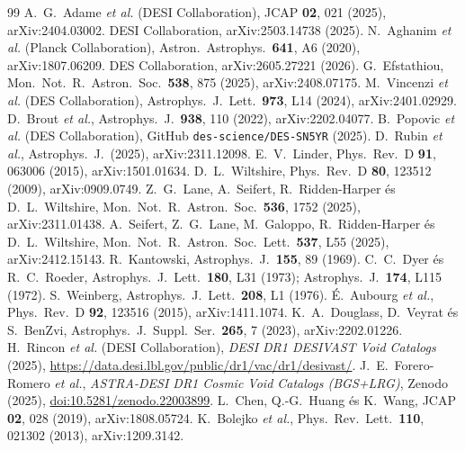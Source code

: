 \documentclass[11pt,a4paper]{article}
\begin{document}
\begin{thebibliography}{99}
 A.~G.~Adame \textit{et al.} (DESI Collaboration), JCAP \textbf{02}, 021 (2025), arXiv:2404.03002.
 DESI Collaboration, arXiv:2503.14738 (2025).
 N.~Aghanim \textit{et al.} (Planck Collaboration), Astron.\ Astrophys.\ \textbf{641}, A6 (2020), arXiv:1807.06209.
 DES Collaboration, arXiv:2605.27221 (2026).
 G.~Efstathiou, Mon.\ Not.\ R.\ Astron.\ Soc.\ \textbf{538}, 875 (2025), arXiv:2408.07175.
 M.~Vincenzi \textit{et al.} (DES Collaboration), Astrophys.\ J.\ Lett.\ \textbf{973}, L14 (2024), arXiv:2401.02929.
 D.~Brout \textit{et al.}, Astrophys.\ J.\ \textbf{938}, 110 (2022), arXiv:2202.04077.
 B.~Popovic \textit{et al.} (DES Collaboration), GitHub \texttt{des-science/DES-SN5YR} (2025).
 D.~Rubin \textit{et al.}, Astrophys.\ J.\ (2025), arXiv:2311.12098.
 E.~V.~Linder, Phys.\ Rev.\ D \textbf{91}, 063006 (2015), arXiv:1501.01634.
 D.~L.~Wiltshire, Phys.\ Rev.\ D \textbf{80}, 123512 (2009), arXiv:0909.0749.
 Z.~G.~Lane, A.~Seifert, R.~Ridden-Harper \'es D.~L.~Wiltshire, Mon.\ Not.\ R.\ Astron.\ Soc.\ \textbf{536}, 1752 (2025), arXiv:2311.01438.
 A.~Seifert, Z.~G.~Lane, M.~Galoppo, R.~Ridden-Harper \'es D.~L.~Wiltshire, Mon.\ Not.\ R.\ Astron.\ Soc.\ Lett.\ \textbf{537}, L55 (2025), arXiv:2412.15143.
 R.~Kantowski, Astrophys.\ J.\ \textbf{155}, 89 (1969).
 C.~C.~Dyer \'es R.~C.~Roeder, Astrophys.\ J.\ Lett.\ \textbf{180}, L31 (1973); Astrophys.\ J.\ \textbf{174}, L115 (1972).
 S.~Weinberg, Astrophys.\ J.\ Lett.\ \textbf{208}, L1 (1976).
 \'E.~Aubourg \textit{et al.}, Phys.\ Rev.\ D \textbf{92}, 123516 (2015), arXiv:1411.1074.
 K.~A.~Douglass, D.~Veyrat \'es S.~BenZvi, Astrophys.\ J.\ Suppl.\ Ser.\ \textbf{265}, 7 (2023), arXiv:2202.01226.
 H.~Rincon \textit{et al.} (DESI Collaboration), \textit{DESI DR1 DESIVAST Void Catalogs} (2025), \url{https://data.desi.lbl.gov/public/dr1/vac/dr1/desivast/}.
 J.~E.~Forero-Romero \textit{et al.}, \textit{ASTRA-DESI DR1 Cosmic Void Catalogs (BGS+LRG)}, Zenodo (2025), \href{https://doi.org/10.5281/zenodo.22003899}{doi:10.5281/zenodo.22003899}.
 L.~Chen, Q.-G.~Huang \'es K.~Wang, JCAP \textbf{02}, 028 (2019), arXiv:1808.05724.
 K.~Bolejko \textit{et al.}, Phys.\ Rev.\ Lett.\ \textbf{110}, 021302 (2013), arXiv:1209.3142.
\end{thebibliography}
\end{document}
